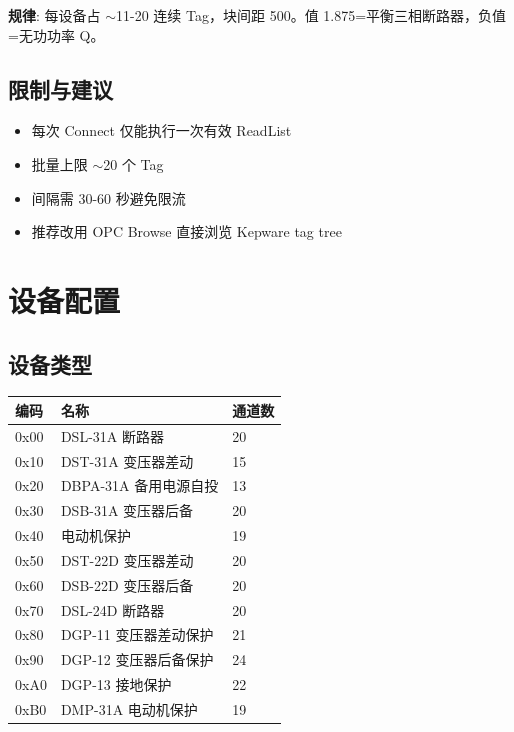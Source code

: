 \documentclass[12pt,a4paper]{ctexart}
\begin{document}
\textbf{规律}: 每设备占 $\sim$11-20 连续 Tag，块间距 500。值 1.875=平衡三相断路器，负值=无功功率 Q。

\subsection{限制与建议}
\begin{itemize}[leftmargin=*]
  \item 每次 Connect 仅能执行一次有效 ReadList
  \item 批量上限 $\sim$20 个 Tag
  \item 间隔需 30-60 秒避免限流
  \item 推荐改用 OPC Browse 直接浏览 Kepware tag tree
\end{itemize}

\section{设备配置}

\subsection{设备类型}
\begin{longtable}{lll}
\toprule
\textbf{编码} & \textbf{名称} & \textbf{通道数} \\
\midrule
0x00 & DSL-31A 断路器 & 20 \\
0x10 & DST-31A 变压器差动 & 15 \\
0x20 & DBPA-31A 备用电源自投 & 13 \\
0x30 & DSB-31A 变压器后备 & 20 \\
0x40 & 电动机保护 & 19 \\
0x50 & DST-22D 变压器差动 & 20 \\
0x60 & DSB-22D 变压器后备 & 20 \\
0x70 & DSL-24D 断路器 & 20 \\
0x80 & DGP-11 变压器差动保护 & 21 \\
0x90 & DGP-12 变压器后备保护 & 24 \\
0xA0 & DGP-13 接地保护 & 22 \\
0xB0 & DMP-31A 电动机保护 & 19 \\
\bottomrule
\end{longtable}
\end{document}
